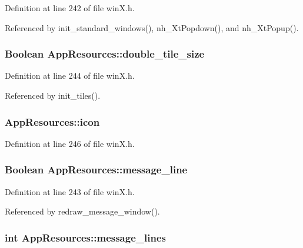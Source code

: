 Definition at line 242 of file win\+X.\+h.



Referenced by init\+\_\+standard\+\_\+windows(), nh\+\_\+\+Xt\+Popdown(), and nh\+\_\+\+Xt\+Popup().

\hypertarget{structAppResources_a21178d8005fbcf96d12f1c7a19299ebd}{
\subsubsection[{double\+\_\+tile\+\_\+size}]{\setlength{\rightskip}{0pt plus 5cm}Boolean App\+Resources\+::double\+\_\+tile\+\_\+size}}\label{structAppResources_a21178d8005fbcf96d12f1c7a19299ebd}


Definition at line 244 of file win\+X.\+h.



Referenced by init\+\_\+tiles().

\hypertarget{structAppResources_acab87331fda96ed505cbd1d1fa1c7456}{
\subsubsection[{icon}]{ App\+Resources\+::icon}}\label{structAppResources_acab87331fda96ed505cbd1d1fa1c7456}


Definition at line 246 of file win\+X.\+h.

\hypertarget{structAppResources_ab51e05aca21e80dd076c0d2b763dd987}{
\subsubsection[{message\+\_\+line}]{\setlength{\rightskip}{0pt plus 5cm}Boolean App\+Resources\+::message\+\_\+line}}\label{structAppResources_ab51e05aca21e80dd076c0d2b763dd987}


Definition at line 243 of file win\+X.\+h.



Referenced by redraw\+\_\+message\+\_\+window().

\hypertarget{structAppResources_acab8a58e15d8d2122aeba73f0861c22b}{
\subsubsection[{message\+\_\+lines}]{\setlength{\rightskip}{0pt plus 5cm}int App\+Resources\+::message\+\_\+lines}}\label{structAppResources_acab8a58e15d8d2122aeba73f0861c22b}


